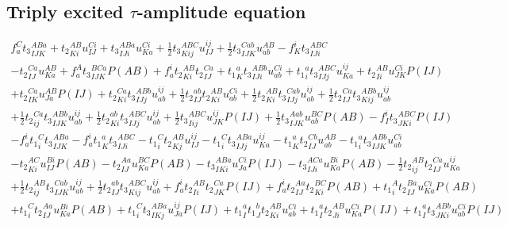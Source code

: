 \subsection{Triply excited $\tau$-amplitude equation}

\begin{gather*}
f^{C}_{a} {t_3}^{ABa}_{IJK}
+ {t_2}^{AB}_{Ki} u^{Ci}_{IJ}
+ {t_3}^{ABa}_{IJi} u^{Ci}_{Ka}
+ \frac{1}{2}{t_3}^{ABC}_{Kij} u^{ij}_{IJ}
+ \frac{1}{2}{t_3}^{Cab}_{IJK} u^{AB}_{ab}
- f^{i}_{K} {t_3}^{ABC}_{IJi} \\
- {t_2}^{Ca}_{IJ} u^{AB}_{Ka}
+ f^{A}_{a} {t_3}^{BCa}_{IJK} P(AB)
+ f^{i}_{a} {t_2}^{AB}_{Ki} {t_2}^{Ca}_{IJ}
+ {t_1}^{a}_{K} {t_3}^{ABb}_{IJi} u^{Ci}_{ab}
+ {t_1}^{a}_{i} {t_3}^{ABC}_{IJj} u^{ij}_{Ka}
+ {t_2}^{AB}_{Ii} u^{Ci}_{JK} P(IJ) \\
+ {t_2}^{Ca}_{IK} u^{AB}_{Ja} P(IJ)
+ {t_2}^{Ca}_{Ki} {t_3}^{ABb}_{IJj} u^{ij}_{ab}
+ \frac{1}{2}{t_2}^{ab}_{IJ} {t_2}^{AB}_{Ki} u^{Ci}_{ab}
+ \frac{1}{2}{t_2}^{AB}_{Ki} {t_3}^{Cab}_{IJj} u^{ij}_{ab}
+ \frac{1}{2}{t_2}^{Ca}_{IJ} {t_3}^{ABb}_{Kij} u^{ij}_{ab} \\
+ \frac{1}{2}{t_2}^{Ca}_{ij} {t_3}^{ABb}_{IJK} u^{ij}_{ab}
+ \frac{1}{2}{t_2}^{ab}_{Ki} {t_3}^{ABC}_{IJj} u^{ij}_{ab}
+ \frac{1}{2}{t_3}^{ABC}_{Iij} u^{ij}_{JK} P(IJ)
+ \frac{1}{2}{t_3}^{Aab}_{IJK} u^{BC}_{ab} P(AB)
- f^{i}_{I} {t_3}^{ABC}_{JKi} P(IJ) \\
- f^{i}_{a} {t_1}^{C}_{i} {t_3}^{ABa}_{IJK}
- f^{i}_{a} {t_1}^{a}_{K} {t_3}^{ABC}_{IJi}
- {t_1}^{C}_{i} {t_2}^{AB}_{Kj} u^{ij}_{IJ}
- {t_1}^{C}_{i} {t_3}^{ABa}_{IJj} u^{ij}_{Ka}
- {t_1}^{a}_{K} {t_2}^{Cb}_{IJ} u^{AB}_{ab}
- {t_1}^{a}_{i} {t_3}^{ABb}_{IJK} u^{Ci}_{ab} \\
- {t_2}^{AC}_{Ki} u^{Bi}_{IJ} P(AB)
- {t_2}^{Aa}_{IJ} u^{BC}_{Ka} P(AB)
- {t_3}^{ABa}_{IKi} u^{Ci}_{Ja} P(IJ)
- {t_3}^{ACa}_{IJi} u^{Bi}_{Ka} P(AB)
- \frac{1}{2}{t_2}^{AB}_{ij} {t_2}^{Ca}_{IJ} u^{ij}_{Ka} \\
+ \frac{1}{2}{t_2}^{AB}_{ij} {t_3}^{Cab}_{IJK} u^{ij}_{ab}
+ \frac{1}{2}{t_2}^{ab}_{IJ} {t_3}^{ABC}_{Kij} u^{ij}_{ab}
+ f^{i}_{a} {t_2}^{AB}_{Ii} {t_2}^{Ca}_{JK} P(IJ)
+ f^{i}_{a} {t_2}^{Aa}_{IJ} {t_2}^{BC}_{Ki} P(AB)
+ {t_1}^{A}_{i} {t_2}^{Ba}_{IJ} u^{Ci}_{Ka} P(AB) \\
+ {t_1}^{C}_{i} {t_2}^{Aa}_{IJ} u^{Bi}_{Ka} P(AB)
+ {t_1}^{C}_{i} {t_3}^{ABa}_{IKj} u^{ij}_{Ja} P(IJ)
+ {t_1}^{a}_{I} {t_1}^{b}_{J} {t_2}^{AB}_{Ki} u^{Ci}_{ab}
+ {t_1}^{a}_{I} {t_2}^{AB}_{Ji} u^{Ci}_{Ka} P(IJ)
+ {t_1}^{a}_{I} {t_3}^{ABb}_{JKi} u^{Ci}_{ab} P(IJ) \\

\end{gather*}
